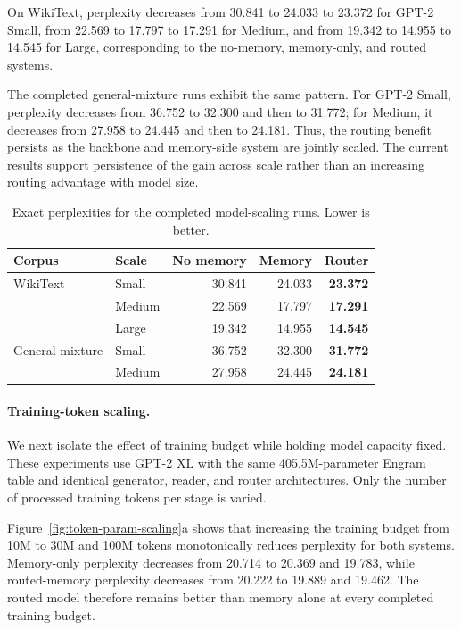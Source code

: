 On WikiText, perplexity decreases from 30.841 to 24.033 to 23.372 for
GPT-2 Small, from 22.569 to 17.797 to 17.291 for Medium, and from
19.342 to 14.955 to 14.545 for Large, corresponding to the
no-memory, memory-only, and routed systems.

The completed general-mixture runs exhibit the same pattern. For GPT-2 Small,
perplexity decreases from 36.752 to 32.300 and then to 31.772; for Medium,
it decreases from 27.958 to 24.445 and then to 24.181.
Thus, the routing benefit persists as the backbone and memory-side system are
jointly scaled. The current results support persistence of the gain across
scale rather than an increasing routing advantage with model size.

\begin{table}[t]
\centering
\caption{
Exact perplexities for the completed model-scaling runs.
Lower is better.
}
\label{tab:model-scaling-values}
\small
\setlength{\tabcolsep}{7pt}
\begin{tabular}{@{}llrrr@{}}
\toprule
\textbf{Corpus}
& \textbf{Scale}
& \textbf{No memory}
& \textbf{Memory}
& \textbf{Router} \\
\midrule
WikiText
& Small
& 30.841
& 24.033
& \textbf{23.372} \\

& Medium
& 22.569
& 17.797
& \textbf{17.291} \\

& Large
& 19.342
& 14.955
& \textbf{14.545} \\

\addlinespace[2pt]
General mixture
& Small
& 36.752
& 32.300
& \textbf{31.772} \\

& Medium
& 27.958
& 24.445
& \textbf{24.181} \\
\bottomrule
\end{tabular}
\end{table}

\paragraph{Training-token scaling.}
We next isolate the effect of training budget while holding model capacity
fixed. These experiments use GPT-2 XL with the same 405.5M-parameter Engram
table and identical generator, reader, and router architectures. Only the
number of processed training tokens per stage is varied.

Figure~\ref{fig:token-param-scaling}a shows that increasing the training budget
from 10M to 30M and 100M tokens monotonically reduces perplexity for both
systems. Memory-only perplexity decreases from 20.714 to 20.369 and 19.783,
while routed-memory perplexity decreases from 20.222 to 19.889 and 19.462.
The routed model therefore remains better than memory alone at every completed
training budget.


